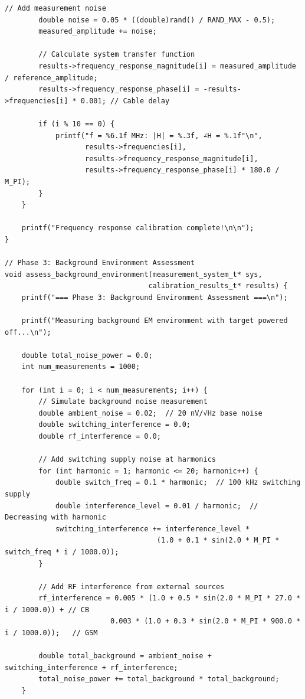 \documentclass[11pt,a4paper]{article}
\theoremstyle{definition}
\begin{document}
\begin{lstlisting}[caption={Complete EM Calibration Implementation}]
        // Add measurement noise
        double noise = 0.05 * ((double)rand() / RAND_MAX - 0.5);
        measured_amplitude += noise;
        
        // Calculate system transfer function
        results->frequency_response_magnitude[i] = measured_amplitude / reference_amplitude;
        results->frequency_response_phase[i] = -results->frequencies[i] * 0.001; // Cable delay
        
        if (i % 10 == 0) {
            printf("f = %6.1f MHz: |H| = %.3f, ∠H = %.1f°\n", 
                   results->frequencies[i], 
                   results->frequency_response_magnitude[i],
                   results->frequency_response_phase[i] * 180.0 / M_PI);
        }
    }
    
    printf("Frequency response calibration complete!\n\n");
}

// Phase 3: Background Environment Assessment
void assess_background_environment(measurement_system_t* sys, 
                                  calibration_results_t* results) {
    printf("=== Phase 3: Background Environment Assessment ===\n");
    
    printf("Measuring background EM environment with target powered off...\n");
    
    double total_noise_power = 0.0;
    int num_measurements = 1000;
    
    for (int i = 0; i < num_measurements; i++) {
        // Simulate background noise measurement
        double ambient_noise = 0.02;  // 20 nV/√Hz base noise
        double switching_interference = 0.0;
        double rf_interference = 0.0;
        
        // Add switching supply noise at harmonics
        for (int harmonic = 1; harmonic <= 20; harmonic++) {
            double switch_freq = 0.1 * harmonic;  // 100 kHz switching supply
            double interference_level = 0.01 / harmonic;  // Decreasing with harmonic
            switching_interference += interference_level * 
                                    (1.0 + 0.1 * sin(2.0 * M_PI * switch_freq * i / 1000.0));
        }
        
        // Add RF interference from external sources
        rf_interference = 0.005 * (1.0 + 0.5 * sin(2.0 * M_PI * 27.0 * i / 1000.0)) + // CB
                         0.003 * (1.0 + 0.3 * sin(2.0 * M_PI * 900.0 * i / 1000.0));   // GSM
        
        double total_background = ambient_noise + switching_interference + rf_interference;
        total_noise_power += total_background * total_background;
    }
    

\end{lstlisting}
\end{document}
